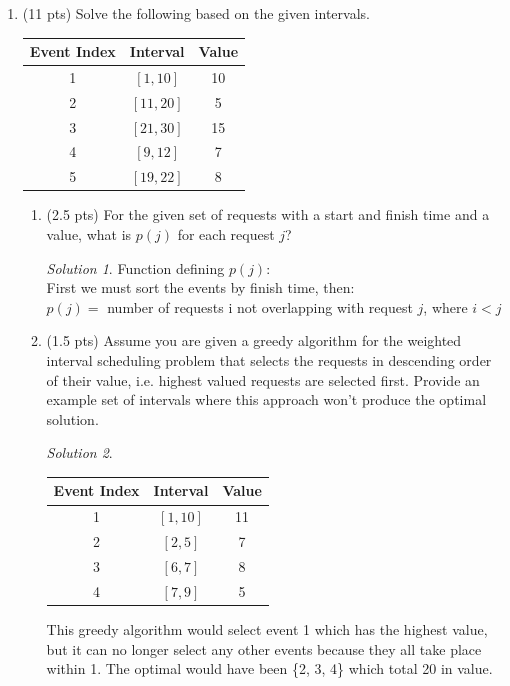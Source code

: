 \documentclass[12pt]{article}
\theoremstyle{remark}
\newtheorem*{solution}{Solution}
\begin{document}
\begin{enumerate}

\item (11 pts) Solve the following based on the given intervals.
\begin{center}
\begin{tabular}{c|c|c}
Event Index & Interval & Value\\ \hline
1 & $[1, 10]$ & 10\\ 
2 & $[11, 20]$  & 5\\
3 & $[21, 30]$  & 15\\
4 & $[9, 12]$ & 7\\
5 & $[19, 22]$ & 8
\end{tabular}
\end{center}

\begin{enumerate}

\item (2.5 pts) For the given set of requests with a start and finish time and a value, what is $p(j)$ for each request $j$?

\begin{solution}Function defining $p(j)$: \\
First we must sort the events by finish time, then: \\
$p(j) =$ number of requests i not overlapping with request $j$, where $i < j$
\end{solution}

\item (1.5 pts) Assume you are given a greedy algorithm for the weighted interval scheduling problem that selects the requests in descending order of their value, i.e. highest valued requests are selected first. Provide an example set of intervals where this approach won't produce the optimal solution.
\begin{solution}
\begin{center}
\begin{tabular}{c|c|c}
Event Index & Interval & Value\\ \hline
1 & $[1, 10]$ & 11\\ 
2 & $[2, 5]$  & 7\\
3 & $[6, 7]$  & 8\\
4 & $[7, 9]$ & 5
\end{tabular}
\end{center}
This greedy algorithm would select event 1 which has the highest value, but it can no longer select any other events because they all take place within 1. The optimal would have been \{2, 3, 4\} which total 20 in value.
\end{solution}


\end{enumerate}
\end{enumerate}
\end{document}
